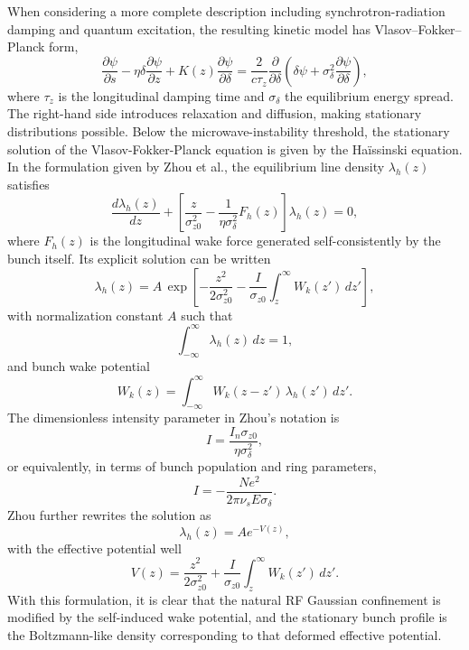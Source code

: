 \documentclass[11pt,a4paper]{article}
\begin{document}
\begin{sloppypar}
When considering a more complete description including synchrotron-radiation damping and quantum excitation, the resulting kinetic model has Vlasov--Fokker--Planck form,
\begin{equation}
    \frac{\partial \psi}{\partial s}-\eta\delta\frac{\partial \psi}{\partial z}+K(z)\frac{\partial \psi}{\partial \delta}
    =\frac{2}{c\tau_z}\frac{\partial}{\partial\delta}\left(\delta\psi+\sigma_\delta^2\frac{\partial\psi}{\partial\delta}\right),
    \label{eq:vfp_revised}
\end{equation}
where $\tau_z$ is the longitudinal damping time and $\sigma_\delta$ the equilibrium energy spread. The right-hand side introduces relaxation and diffusion, making stationary distributions possible.
Below the microwave-instability threshold, the stationary solution of the Vlasov-Fokker-Planck equation is given by the Ha\"issinski equation. In the formulation given by Zhou et al., the equilibrium line density $\lambda_h(z)$ satisfies
\begin{equation}
\frac{d\lambda_h(z)}{dz}
+
\left[
\frac{z}{\sigma_{z0}^2}
-
\frac{1}{\eta\sigma_\delta^2}F_h(z)
\right]
\lambda_h(z)
=
0,
\label{eq:haissinski_diff}
\end{equation}
where $F_h(z)$ is the longitudinal wake force generated self-consistently by the bunch itself. Its explicit solution can be written
\begin{equation}
\lambda_h(z)
=
A\,
\exp\!\left[
-\frac{z^2}{2\sigma_{z0}^2}
-
\frac{I}{\sigma_{z0}}
\int_z^\infty W_k(z')\,dz'
\right],
\label{eq:haissinski_sol}
\end{equation}
with normalization constant $A$ such that
\begin{equation}
\int_{-\infty}^{\infty}\lambda_h(z)\,dz=1,
\end{equation}
and bunch wake potential
\begin{equation}
W_k(z)
=
\int_{-\infty}^{\infty}
W_k(z-z')\,\lambda_h(z')\,dz'.
\label{eq:wake_potential_self}
\end{equation}
The dimensionless intensity parameter in Zhou’s notation is
\begin{equation}
I=\frac{I_n\sigma_{z0}}{\eta\sigma_\delta^2},
\end{equation}
or equivalently, in terms of bunch population and ring parameters,
\begin{equation}
I=-\frac{Ne^2}{2\pi\nu_s E\sigma_\delta}.
\end{equation}
Zhou further rewrites the solution as
\begin{equation}
\lambda_h(z)=A e^{-V(z)},
\end{equation}
with the effective potential well
\begin{equation}
V(z)
=
\frac{z^2}{2\sigma_{z0}^2}
+
\frac{I}{\sigma_{z0}}
\int_z^\infty W_k(z')\,dz'.
\label{eq:effective_potential}
\end{equation}
With this formulation, it is clear that the natural RF Gaussian confinement is modified by the self-induced wake potential, and the stationary bunch profile is the Boltzmann-like density corresponding to that deformed effective potential.


\end{sloppypar}
\end{document}
